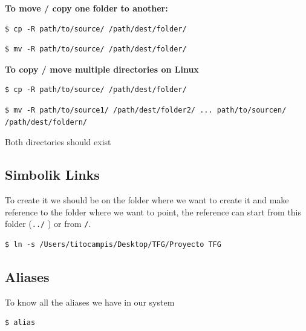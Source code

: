 \documentclass{article}
\newenvironment{blocktemplate}[1]{%
    \tcolorbox[beamer,%
    noparskip,breakable,
    colframe=Blue,%
    colbacklower=LimeGreen!75!LightGreen,%
    title=#1]}%
    {\endtcolorbox}
\newenvironment{codetemplate}[1][]{%
  \mybasecolorbox[#1]
  \itshape
}{%
  \endmybasecolorbox
}
\begin{document}
\textbf{To move / copy one folder to another:}
\begin{codetemplate}{}
\begin{verbatim}
$ cp -R path/to/source/ /path/dest/folder/
\end{verbatim}
\end{codetemplate}
\begin{codetemplate}{}
\begin{verbatim}
$ mv -R path/to/source/ /path/dest/folder/
\end{verbatim}
\end{codetemplate}

\textbf{To copy / move multiple directories on Linux}
\begin{codetemplate}{}
\begin{verbatim}
$ cp -R path/to/source/ /path/dest/folder/
\end{verbatim}
\end{codetemplate}
\begin{codetemplate}{}
\begin{verbatim}
$ mv -R path/to/source1/ /path/dest/folder2/ ... path/to/sourcen/ /path/dest/foldern/
\end{verbatim}
\end{codetemplate}

\begin{blocktemplate}{NOTE}
Both directories should exist
\end{blocktemplate}

\subsection{Simbolik Links}
To create it we should be on the folder where we want to create it and make reference to the folder where we want to point, the reference can start from this folder (\verb|../| ) or from \verb|/|.
\begin{codetemplate}{}
\begin{verbatim}
$ ln -s /Users/titocampis/Desktop/TFG/Proyecto TFG
\end{verbatim}
\end{codetemplate}

\subsection{Aliases}
To know all the aliases we have in our system
\begin{codetemplate}
\begin{verbatim}
$ alias
\end{verbatim}
\end{codetemplate}
\end{document}

